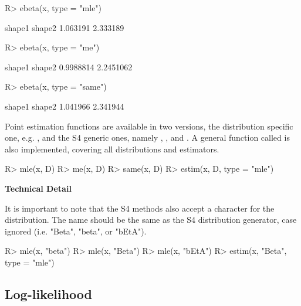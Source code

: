 \documentclass[nojss]{jss}
\newcommand{\fct}[1]{\code{#1()}}
\begin{document}
\begin{Schunk}
\begin{Sinput}
R> ebeta(x, type = "mle")
\end{Sinput}
\begin{Soutput}
  shape1   shape2 
1.063191 2.333189 
\end{Soutput}
\begin{Sinput}
R> ebeta(x, type = "me")
\end{Sinput}
\begin{Soutput}
   shape1    shape2 
0.9988814 2.2451062 
\end{Soutput}
\begin{Sinput}
R> ebeta(x, type = "same")
\end{Sinput}
\begin{Soutput}
  shape1   shape2 
1.041966 2.341944 
\end{Soutput}
\end{Schunk}

Point estimation functions are available in two versions, the distribution specific one, e.g. \fct{ebeta}, and the S4 generic ones, namely \fct{mle}, \fct{me}, and \fct{same}. A general function called \fct{estim} is also implemented, covering all distributions and estimators.

\begin{CodeChunk}
\begin{CodeInput}
R> mle(x, D)
R> me(x, D)
R> same(x, D)
R> estim(x, D, type = "mle")
\end{CodeInput}
\end{CodeChunk}

\begin{leftbar}
\textbf{Technical Detail}

It is important to note that the S4 methods also accept a character for the distribution. The name should be the same as the S4 distribution generator, case ignored (i.e. "Beta", "beta", or "bEtA").

\begin{CodeChunk}
\begin{CodeInput}
R> mle(x, "beta")
R> mle(x, "Beta")
R> mle(x, "bEtA")
R> estim(x, "Beta", type = "mle")
\end{CodeInput}
\end{CodeChunk}

\end{leftbar}

\subsection[Log-likelihood]{Log-likelihood}\label{ss:ll}
\end{document}
